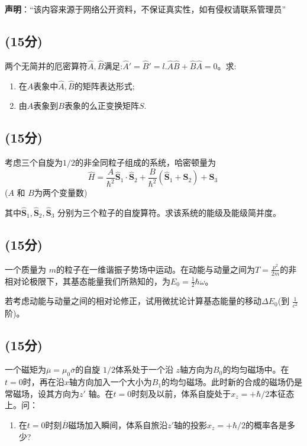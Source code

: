 
\textbf{声明}：“该内容来源于网络公开资料，不保证真实性，如有侵权请联系管理员”

\subsection{(15分)}
两个无简并的厄密算符$\hat{A},\hat{B}$满足:$\hat{A}'=\hat{B}'=l$.$\hat{A}\hat{B}+\hat{B}\hat{A}=0$。求:
\begin{enumerate}
\item 在$A$表象中$\hat{A},\hat{B}$的矩阵表达形式;
\item 由$A$表象到$B$表象的么正变换矩阵$S$.
\end{enumerate}
\subsection{(15分)}
考虑三个自旋为$1/2$的非全同粒子组成的系统，哈密顿量为$$\hat{H} = \frac{A}{\hbar^2} \hat{\mathbf{S}}_1 \cdot \hat{\mathbf{S}}_2 + \frac{B}{\hbar^2} (\hat{\mathbf{S}}_1  + \hat{\mathbf{S}}_2)+\hat{\mathbf{S}}_3~$$ ($A$ 和 $B$为两个变量数)

其中$\hat{\mathbf{S}}_1, \hat{\mathbf{S}}_2, \hat{\mathbf{S}}_3$ 分别为三个粒子的自旋算符。求该系统的能级及能级简并度。
\subsection{(15分)}
 一个质量为 $m$的粒子在一维谐振子势场中运动。在动能与动量之间为$T = \frac{p^2}{2m}$的非相对论极限下，其基态能量我们所熟知的，为$E_0 = \frac{1}{2}\hbar\omega$。

若考虑动能与动量之间的相对论修正，试用微扰论计算基态能量的移动$\Delta E_0$(到 $\frac{1}{c^2}$阶)。
\subsection{(15分)}
一个磁矩为$\overline{\mu} = \mu_0 \overline{\sigma}$的自旋 $1/2$体系处于一个沿 $z$轴方向为$B_0$的均匀磁场中。在$t=0$时，再在沿$x$轴方向加入一个大小为$B_1$的均匀磁场。此时新的合成的磁场仍是常磁场，设其方向为$z'$ 轴。在$t=0$时刻及以前，体系自旋处于$x_{z} = +\hbar/2$本征态上。问：
\begin{enumerate}
\item 在$t=0$时刻$\overline{B}$磁场加入瞬间，体系自旅沿$z'$轴的投影$x_{z} = +\hbar/2$的概率各是多少?
\end{enumerate}

